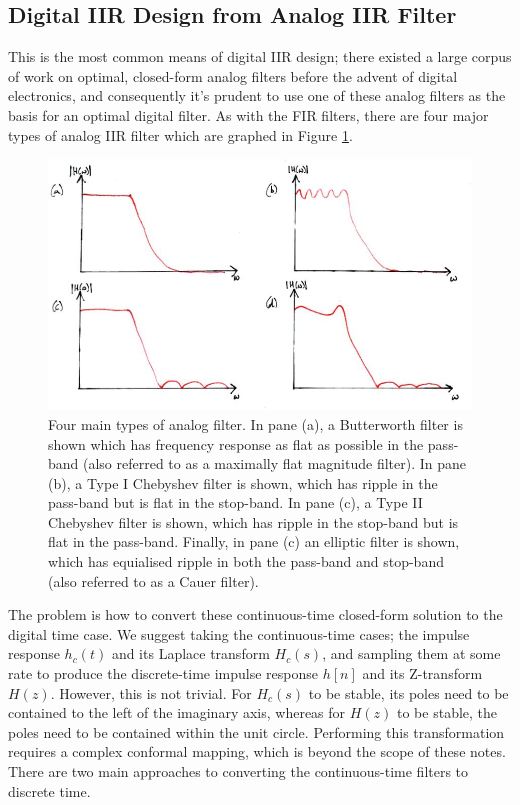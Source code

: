 \subsection{Digital IIR Design from Analog IIR Filter}
%
This is the most common means of digital IIR design; there existed a large
corpus of work on optimal, closed-form analog filters before the advent of digital
electronics, and consequently it's prudent to use one of these analog
filters as the basis for an optimal digital filter. As with the
FIR filters, there are four major types of analog IIR filter which are
graphed in Figure \ref{fig::lecture_18_analog_filters}.\\
%
\begin{figure}[!htb]
  \includegraphics[width=\textwidth]{images/lecture_18_analog_filters.JPG}
  \caption{Four main types of analog filter. In pane (a), a Butterworth
    filter is shown which has frequency response as flat as possible in the
    pass-band (also referred to as a maximally flat magnitude filter). In
    pane (b), a Type I Chebyshev filter is shown, which has ripple in the
    pass-band but is flat in the stop-band. In pane (c), a Type II Chebyshev
    filter is shown, which has ripple in the stop-band but is flat in the
    pass-band. Finally, in pane (c) an elliptic filter is shown, which
    has equialised ripple in both the pass-band and stop-band (also
    referred to as a Cauer filter).
  }
  \label{fig::lecture_18_analog_filters}
\end{figure}
%
The problem is how to convert these continuous-time closed-form solution to
the digital time case. We suggest taking the continuous-time cases;
the impulse response $h_c(t)$ and its Laplace transform $H_c(s)$, and
sampling them at some rate to produce the discrete-time impulse response
$h[n]$ and its Z-transform $H(z)$. However, this is not trivial. For
$H_c(s)$ to be stable, its poles need to be contained to the left of the
imaginary axis, whereas for $H(z)$ to be stable, the poles need to be
contained within the unit circle. Performing this transformation requires
a complex conformal mapping, which is beyond the scope of these notes.\\
%
There are two main approaches to converting the continuous-time filters
to discrete time.

